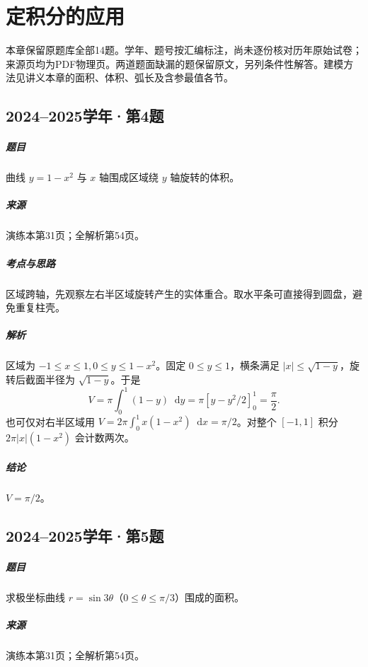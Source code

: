\documentclass[UTF8,fontset=fandol,12pt,oneside,openany]{ctexrep}
\newcommand{\dd}{\mathop{}\!\mathrm d}
\theoremstyle{definition}
\begin{document}
\chapter{定积分的应用}
\label{exam:12:chapter}
本章保留原题库全部14题。学年、题号按汇编标注，尚未逐份核对历年原始试卷；来源页均为PDF物理页。两道题面缺漏的题保留原文，另列条件性解答。建模方法见讲义本章的面积、体积、弧长及含参最值各节。

\par\addvspace{18pt}\noindent\begin{minipage}{\linewidth}
\section{2024--2025学年·第4题}
\paragraph{题目}曲线 $y=1-x^2$ 与 $x$ 轴围成区域绕 $y$ 轴旋转的体积。
\paragraph{来源}演练本第31页；全解析第54页。
\end{minipage}\par
\paragraph{考点与思路}区域跨轴，先观察左右半区域旋转产生的实体重合。取水平条可直接得到圆盘，避免重复柱壳。
\paragraph{解析}区域为 $-1\le x\le1,0\le y\le1-x^2$。固定 $0\le y\le1$，横条满足 $|x|\le\sqrt{1-y}$，旋转后截面半径为 $\sqrt{1-y}$。于是
\[
 V=\pi\int_0^1(1-y)\dd y
 =\pi[y-y^2/2]_0^1=\frac\pi2.
\]
也可仅对右半区域用 $V=2\pi\int_0^1x(1-x^2)\dd x=\pi/2$。对整个 $[-1,1]$ 积分 $2\pi|x|(1-x^2)$ 会计数两次。
\paragraph{结论}$V=\pi/2$。

\par\addvspace{18pt}\noindent\begin{minipage}{\linewidth}
\section{2024--2025学年·第5题}
\paragraph{题目}求极坐标曲线 $r=\sin3\theta$（$0\le\theta\le\pi/3$）围成的面积。
\paragraph{来源}演练本第31页；全解析第54页。
\end{minipage}\par
\end{document}
